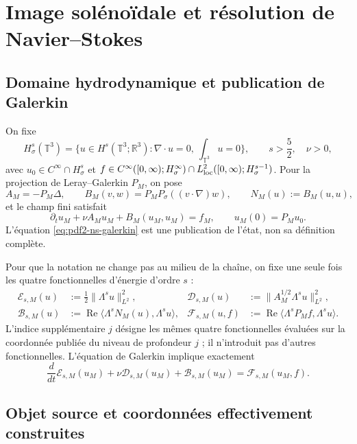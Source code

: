 \chapter{Image solénoïdale et résolution de Navier--Stokes}

\section{Domaine hydrodynamique et publication de Galerkin}

On fixe
\[
 H^s_\sigma(\mathbb T^3)=
 \{u\in H^s(\mathbb T^3;\mathbb R^3):
   \nabla\!\cdot u=0,\ \int_{\mathbb T^3}u=0\},
 \qquad s>\frac52,\quad\nu>0,
\]
avec
$u_0\in C^\infty\cap H^s_\sigma$ et
$f\in C^\infty([0,\infty);H^\infty_\sigma)
\cap L^2_{\rm loc}([0,\infty);H^{s-1}_\sigma)$. Pour la projection de
Leray--Galerkin $P_M$, on pose
\[
 A_M=-P_M\Delta,
 \qquad B_M(v,w)=P_MP_\sigma((v\cdot\nabla)w),
 \qquad N_M(u):=B_M(u,u),
\]
et le champ fini satisfait
\begin{equation}\label{eq:pdf2-ns-galerkin}
 \partial_tu_M+\nu A_Mu_M+B_M(u_M,u_M)=f_M,
 \qquad u_M(0)=P_Mu_0.
\end{equation}
L'équation \eqref{eq:pdf2-ns-galerkin} est une publication de l'état, non sa
définition complète.

Pour que la notation ne change pas au milieu de la chaîne, on fixe une seule fois les
quatre fonctionnelles d'énergie d'ordre $s$ :
\begin{equation}\label{eq:pdf2-ns-energy-functionals}
 \begin{aligned}
 \mathscr E_{s,M}(u)&:=\frac12\|\Lambda^su\|_{L^2}^2,
 &\mathscr D_{s,M}(u)&:=\|A_M^{1/2}\Lambda^su\|_{L^2}^2,\\
 \mathscr B_{s,M}(u)&:=
   \operatorname{Re}\langle\Lambda^sN_M(u),\Lambda^su\rangle,
 &\mathscr F_{s,M}(u,f)&:=
   \operatorname{Re}\langle\Lambda^sP_Mf,\Lambda^su\rangle.
 \end{aligned}
\end{equation}
L'indice supplémentaire $j$ désigne les mêmes quatre fonctionnelles évaluées sur
la coordonnée publiée du niveau de profondeur $j$ ; il n'introduit pas d'autres
fonctionnelles.
L'équation de Galerkin implique exactement
\begin{equation}\label{eq:pdf2-ns-energy-identity}
 \frac d{dt}\mathscr E_{s,M}(u_M)
 +\nu\mathscr D_{s,M}(u_M)+\mathscr B_{s,M}(u_M)
 =\mathscr F_{s,M}(u_M,f).
\end{equation}

\section{Objet source et coordonnées effectivement construites}


